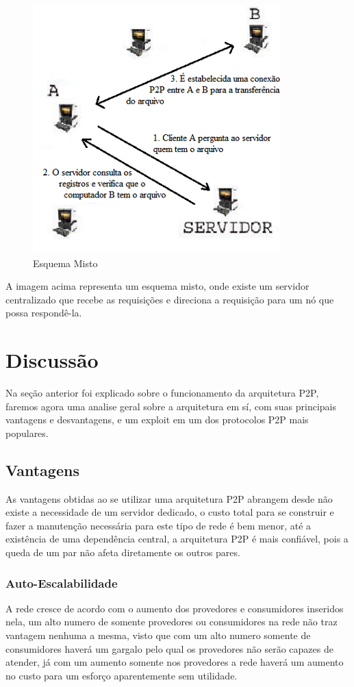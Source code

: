 \documentclass[a4paper]{article}
\begin{document}
\begin{figure} [!ht]
\begin{center}
  \includegraphics{img//misto.png}
  \caption{Esquema Misto \cite{sisp2p}} 
\end{center}
\end{figure}
A imagem acima representa um esquema misto, onde existe um servidor centralizado que recebe as requisições e direciona a requisição para um nó que possa respondê-la.

\section{Discussão}
Na seção anterior foi explicado sobre o funcionamento da arquitetura P2P, faremos agora uma analise geral sobre a arquitetura em sí, com suas principais vantagens e desvantagens, e um exploit em um dos protocolos P2P mais populares.

\subsection{Vantagens}
As vantagens obtidas ao se utilizar uma arquitetura P2P abrangem desde não existe a necessidade de um servidor dedicado, o custo total para se construir e fazer a manutenção necessária para este tipo de rede é bem menor, até a existência de uma dependência central, a arquitetura P2P é mais confiável, pois a queda de um par não afeta diretamente os outros pares.

\subsubsection{Auto-Escalabilidade}
A rede cresce de acordo com o aumento dos provedores e consumidores inseridos nela, um alto numero de somente provedores ou consumidores na rede não traz vantagem nenhuma a mesma, visto que com um alto numero somente de consumidores haverá um gargalo pelo qual os provedores não serão capazes de atender, já com um aumento somente nos provedores a rede haverá um aumento no custo para um esforço aparentemente sem utilidade.\cite{ACohenBAD}
\end{document}
